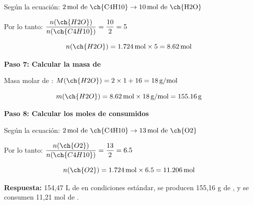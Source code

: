 \begin{exercise}
\begin{solu}
        Según la ecuación: $2\,\text{mol de \ch{C4H10}} \rightarrow 10\,\text{mol de \ch{H2O}}$

        Por lo tanto: $\dfrac{n(\ch{H2O})}{n(\ch{C4H10})} = \dfrac{10}{2} = 5$

        \begin{equation*}
            n(\ch{H2O}) = 1.724\,\text{mol} \times 5 = 8.62\,\text{mol}
        \end{equation*}

        \textbf{Paso 7: Calcular la masa de }

        Masa molar de : $M(\ch{H2O}) = 2 \times 1 + 16 = 18\,\text{g/mol}$

        \begin{equation*}
            m(\ch{H2O}) = 8.62\,\text{mol} \times 18\,\text{g/mol} = 155.16\,\text{g}
        \end{equation*}

        \textbf{Paso 8: Calcular los moles de  consumidos}

        Según la ecuación: $2\,\text{mol de \ch{C4H10}} \rightarrow 13\,\text{mol de \ch{O2}}$

        Por lo tanto: $\dfrac{n(\ch{O2})}{n(\ch{C4H10})} = \dfrac{13}{2} = 6.5$

        \begin{equation*}
            n(\ch{O2}) = 1.724\,\text{mol} \times 6.5 = 11.206\,\text{mol}
        \end{equation*}

        \textbf{Respuesta:} 154,47 L de  en condiciones estándar, se producen 155,16 g de , y se consumen 11,21 mol de .
    \end{solu}
\end{exercise}

